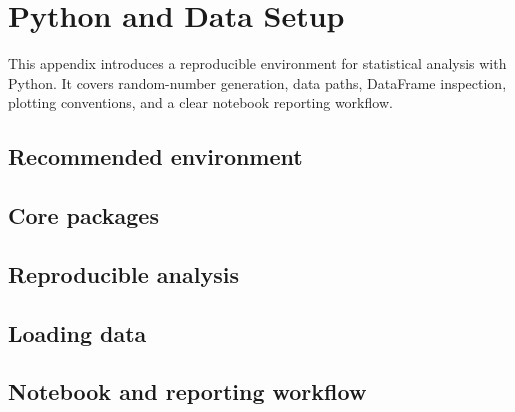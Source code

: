 \chapter{Python and Data Setup}
\label{app:python-data-setup}

This appendix introduces a reproducible environment for statistical analysis
with Python. It covers random-number generation, data paths, DataFrame
inspection, plotting conventions, and a clear notebook reporting workflow.

\section{Recommended environment}

\section{Core packages}

\section{Reproducible analysis}

\section{Loading data}

\section{Notebook and reporting workflow}
